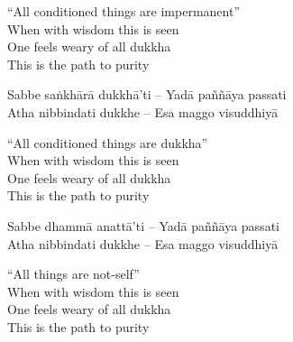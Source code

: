 \begin{english-verses}
    ``All conditioned things are impermanent''\makeatletter\hyperlink{endnote34-appendix}\makeatother\\

  When with wisdom this is seen\\
  One feels weary of all dukkha\makeatletter\hyperlink{endnote35-appendix}\makeatother\\

  This is the path to purity
\end{english-verses}

\begin{verses}
  Sabbe saṅkhārā dukkhā'ti – Yadā paññāya passati\\
  Atha nibbindati dukkhe – Esa maggo visuddhiyā
\end{verses}

\begin{english-verses}
  ``All conditioned things are dukkha''\\
  When with wisdom this is seen\\
  One feels weary of all dukkha\\
  This is the path to purity
\end{english-verses}

\begin{verses}
  Sabbe dhammā anattā'ti – Yadā paññāya passati\\
  Atha nibbindati dukkhe – Esa maggo visuddhiyā
\end{verses}

\begin{english-verses}
    ``All things are not-self''\makeatletter\hyperlink{endnote36-appendix}\makeatother\\

  When with wisdom this is seen\\
  One feels weary of all dukkha\\
  This is the path to purity
\end{english-verses}

